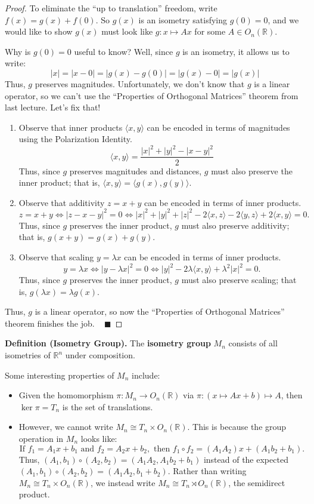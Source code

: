 \begin{proof}
    To eliminate the ``up to translation'' freedom, write $f(x) = g(x) + f(0)$.  So $g(x)$ is an isometry satisfying $g(0) = 0$, and we would like to show $g(x)$ must look like $g: x \mapsto Ax$ for some $A \in O_n(\mathbb{R})$.

    Why is $g(0) = 0$ useful to know?  Well, since $g$ is an isometry, it allows us to write:
    \[ |x| = |x - 0| = |g(x) - g(0)| = |g(x) - 0| = |g(x)| \]
    Thus, $g$ preserves magnitudes.  Unfortunately, we don't know that $g$ is a linear operator, so we can't use the ``Properties of Orthogonal Matrices'' theorem from last lecture.  Let's fix that!
    \begin{enumerate}
        \item Observe that inner products $\langle x, y \rangle$ can be encoded in terms of magnitudes using the Polarization Identity.
        \[ \langle x, y \rangle = \frac{|x|^2 + |y|^2 - |x - y|^2}{2} \]
        Thus, since $g$ preserves magnitudes and distances, $g$ must also preserve the inner product; that is, $\langle x, y \rangle = \langle g(x), g(y) \rangle$.
        \item Observe that additivity $z = x + y$ can be encoded in terms of inner products.
        \[ z = x + y \iff |z - x - y|^2 = 0 \iff |x|^2 + |y|^2 + |z|^2 - 2 \langle x, z \rangle - 2 \langle y, z \rangle + 2 \langle x, y \rangle = 0. \]
        Thus, since $g$ preserves the inner product, $g$ must also preserve additivity; that is, $g(x + y) = g(x) + g(y)$.
        \item Observe that scaling $y = \lambda x$ can be encoded in terms of inner products.
        \[ y = \lambda x \iff |y - \lambda x|^2 = 0 \iff |y|^2 - 2 \lambda \langle x, y \rangle + \lambda^2 |x|^2 = 0. \]
        Thus, since $g$ preserves the inner product, $g$ must also preserve scaling; that is, $g(\lambda x) = \lambda g(x)$.
    \end{enumerate}
    Thus, $g$ is a linear operator, so now the ``Properties of Orthogonal Matrices'' theorem finishes the job. ~ $\blacksquare$ 
\end{proof}

\textbf{Definition (Isometry Group).} The \textbf{isometry group} $M_n$ consists of all isometries of $\mathbb{R}^n$ under composition.

Some interesting properties of $M_n$ include:
\begin{itemize}
    \item Given the homomorphism $\pi: M_n \to O_n(\mathbb{R})$ via $\pi: (x \mapsto Ax + b) \mapsto A$, then $\ker \pi = T_n$ is the set of translations.
    \item However, we cannot write $M_n \cong T_n \times O_n(\mathbb{R})$.  This is because the group operation in $M_n$ looks like:
\[ \text{If } f_1 = A_1x + b_1 \text{ and } f_2 = A_2x + b_2, \text{ then } f_1 \circ f_2 = (A_1A_2)x + (A_1b_2 + b_1). \]
    Thus, $(A_1, b_1) \circ (A_2, b_2) = (A_1A_2, A_1b_2 + b_1)$ instead of the expected $(A_1, b_1) \circ (A_2, b_2) = (A_1A_2, b_1 + b_2)$.  Rather than writing $M_n \cong T_n \times O_n(\mathbb{R})$, we instead write $M_n \cong T_n \rtimes O_n(\mathbb{R})$, the semidirect product.
\end{itemize}

